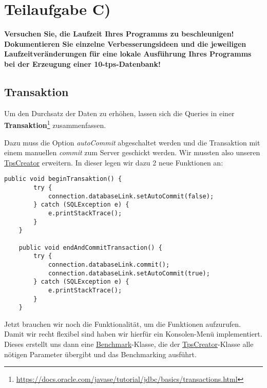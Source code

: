 \section{Teilaufgabe C)}
\textbf{Versuchen Sie, die Laufzeit Ihres Programms zu beschleunigen! Dokumentieren Sie
einzelne Verbesserungsideen und die jeweiligen Laufzeitveränderungen für eine lokale
Ausführung Ihres Programms bei der Erzeugung einer 10-tps-Datenbank!}

\subsection{Transaktion}
Um den Durchsatz der Daten zu erhöhen, lassen sich die Queries in einer
\textbf{Transaktion}\footnote{\url{https://docs.oracle.com/javase/tutorial/jdbc/basics/transactions.html}} zusammenfassen.  

Dazu muss die Option \textit{autoCommit} abgeschaltet werden und die Transaktion
mit einem manuellen \textit{commit} zum Server geschickt werden. Wir mussten
also unseren \hyperref[lst:tpsv2]{TpsCreator} erweitern. In
dieser legen wir dazu 2 neue Funktionen an:

\begin{lstlisting}[caption={Erweiterung der TpsCreator-Klasse}]
	public void beginTransaktion() {
		try {
			connection.databaseLink.setAutoCommit(false);
		} catch (SQLException e) {
			e.printStackTrace();
		}
	}
	
	public void endAndCommitTransaction() {
		try {
			connection.databaseLink.commit();
			connection.databaseLink.setAutoCommit(true);
		} catch (SQLException e) {
			e.printStackTrace();
		}
	}
\end{lstlisting}

Jetzt brauchen wir noch die Funktionalität, um die Funktionen aufzurufen. Damit
wir recht flexibel sind haben wir hierfür ein Konsolen-Menü implementiert.
Dieses erstellt uns dann eine  \hyperref[lst:bmv2]{Benchmark}-Klasse, die der
\hyperref[lst:tpsv2]{TpsCreator}-Klasse alle nötigen Parameter übergibt und das Benchmarking ausführt.

